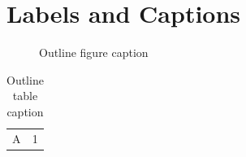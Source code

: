 \section{Labels and Captions}\label{sec:outline-labels}
\begin{figure}[htbp]
  \centering
  \fbox{\rule{0pt}{80pt}\rule{120pt}{0pt}}
  \caption{Outline figure caption}
  \label{fig:outline}
\end{figure}

\begin{table}[htbp]
  \centering
  \begin{tabular}{ll}
    A & 1 \\
  \end{tabular}
  \caption{Outline table caption}
  \label{tab:outline}
\end{table}
